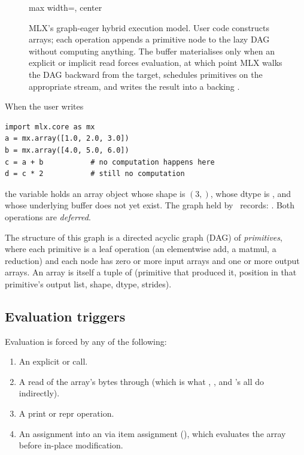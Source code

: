 \begin{figure}[t]
\begin{adjustbox}{max width=\textwidth, center}
\end{adjustbox}
\caption[MLX lazy graph execution.]{MLX's graph-eager hybrid
execution model. User code constructs arrays; each operation
appends a primitive node to the lazy DAG without computing
anything. The buffer materialises only when an explicit
 or implicit read forces evaluation, at which point
MLX walks the DAG backward from the target, schedules primitives
on the appropriate stream, and writes the result into a backing
.}
\label{fig:mlx_runtime:lazy_graph}
\end{figure}

When the user writes
\begin{lstlisting}[style=lucid,language=LucidPython]
import mlx.core as mx
a = mx.array([1.0, 2.0, 3.0])
b = mx.array([4.0, 5.0, 6.0])
c = a + b           # no computation happens here
d = c * 2           # still no computation
\end{lstlisting}
the variable  holds an array object whose shape is
\((3,)\), whose dtype is , and whose underlying
buffer does not yet exist. The graph held by \MLX\ records:
. Both
operations are \emph{deferred}.

The structure of this graph is a directed acyclic graph (DAG) of
\emph{primitives}, where each primitive is a leaf operation (an
elementwise add, a matmul, a reduction) and each node has zero or
more input arrays and one or more output arrays. An array is itself
a tuple of (primitive that produced it, position in that primitive's
output list, shape, dtype, strides).

\subsection{Evaluation triggers}
\label{ssec:mlx_runtime:eval_triggers}

Evaluation is forced by any of the following:

\begin{enumerate}
  \item An explicit  or  call.
  \item A read of the array's bytes through 
    (which is what , , and \Lucid's
     all do indirectly).
  \item A print or repr operation.
  \item An assignment into an  via item assignment
    (), which evaluates the array before
    in-place modification.
\end{enumerate}

